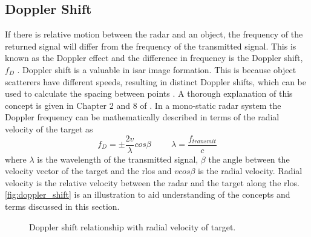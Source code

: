 \documentclass[class=report,11pt,crop=false]{standalone}
\begin{document}
    \subsection{Doppler Shift} \label{theory:doppler_shift}%
    If there is relative motion between the radar and an object, the frequency of the returned signal will differ from the frequency of the transmitted signal. This is known as the Doppler effect and the difference in frequency is the Doppler shift, $f_D$ . Doppler shift is a valuable in \gls{isar} image formation. This is because object scatterers have different speeds, resulting in distinct Doppler shifts, which can be used to calculate the spacing between points \cite{meng_HRRP_alignment}. A thorough explanation of this concept is given in Chapter 2 and 8 of \cite{pomr}. In a mono-static radar system the Doppler frequency can be mathematically described in terms of the radial velocity of the target as
    \begin{equation}\label{eq:doppler_shift}
         f_D = \pm \frac{2v}{\lambda} cos \beta \hspace{1cm} \lambda = \frac{f_{transmit}}{c}
    \end{equation}
    where $\lambda$ is the wavelength of the transmitted signal, $\beta$ the angle between the velocity vector of the target and the \gls{rlos} and  $v cos \beta$ is the radial velocity. Radial velocity is the relative velocity between the radar and the target along the \gls{rlos}. \autoref{fig:doppler_shift} is an illustration to aid understanding of the concepts and terms discussed in this section.
    
    \begin{figure}[h]
        \centering
        \resizebox{0.55\linewidth}{!}{}
        \caption{Doppler shift relationship with radial velocity of target.\label{fig:doppler_shift}}
    \end{figure}
\end{document}
